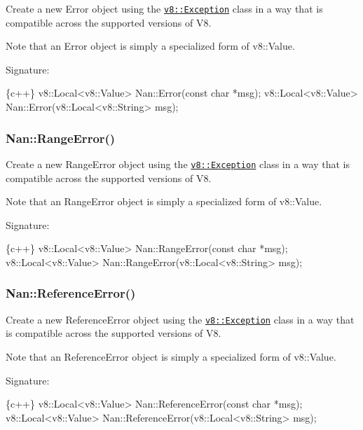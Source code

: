 Create a new Error object using the \href{https://v8docs.nodesource.com/io.js-3.0/da/d6a/classv8_1_1_exception.html}{\tt v8\+::\+Exception} class in a way that is compatible across the supported versions of V8.

Note that an Error object is simply a specialized form of {\ttfamily v8\+::\+Value}.

Signature\+:


\begin{DoxyCode}
\{c++\}
v8::Local<v8::Value> Nan::Error(const char *msg);
v8::Local<v8::Value> Nan::Error(v8::Local<v8::String> msg);
\end{DoxyCode}


\label{_api_nan_range_error}%
 \subsubsection*{Nan\+::\+Range\+Error()}

Create a new Range\+Error object using the \href{https://v8docs.nodesource.com/io.js-3.0/da/d6a/classv8_1_1_exception.html}{\tt v8\+::\+Exception} class in a way that is compatible across the supported versions of V8.

Note that an Range\+Error object is simply a specialized form of {\ttfamily v8\+::\+Value}.

Signature\+:


\begin{DoxyCode}
\{c++\}
v8::Local<v8::Value> Nan::RangeError(const char *msg);
v8::Local<v8::Value> Nan::RangeError(v8::Local<v8::String> msg);
\end{DoxyCode}


\label{_api_nan_reference_error}%
 \subsubsection*{Nan\+::\+Reference\+Error()}

Create a new Reference\+Error object using the \href{https://v8docs.nodesource.com/io.js-3.0/da/d6a/classv8_1_1_exception.html}{\tt v8\+::\+Exception} class in a way that is compatible across the supported versions of V8.

Note that an Reference\+Error object is simply a specialized form of {\ttfamily v8\+::\+Value}.

Signature\+:


\begin{DoxyCode}
\{c++\}
v8::Local<v8::Value> Nan::ReferenceError(const char *msg);
v8::Local<v8::Value> Nan::ReferenceError(v8::Local<v8::String> msg);
\end{DoxyCode}


